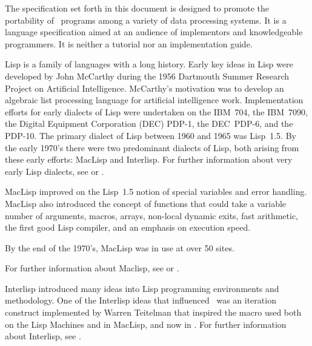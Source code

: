 

The specification set forth in this document is designed to promote
the portability of \clisp\ programs among a variety of data processing
systems. It is a language specification aimed at an audience of
implementors and knowledgeable programmers. It is neither a tutorial nor
an implementation guide.
\endsubSection%

 
Lisp is a family of languages with a long history.  Early key ideas in
Lisp were developed by John McCarthy during the 1956 Dartmouth Summer
Research Project on Artificial Intelligence.  McCarthy's motivation
was to develop an algebraic list processing language for artificial
intelligence work.
Implementation efforts for early dialects of Lisp were undertaken on
the IBM~704, the IBM~7090, the Digital Equipment Corporation (DEC) PDP-1,
the DEC~PDP-6, and the PDP-10. The primary dialect of Lisp between
1960 and 1965 was Lisp~1.5. By the early 1970's there were two
predominant dialects of Lisp, both arising from these early efforts:
MacLisp and Interlisp.
For further information about very early Lisp dialects, 
see {\AnatomyOfLisp} or {\LispOnePointFive}.
 
MacLisp improved on the Lisp~1.5 notion of special variables and error
handling. MacLisp also introduced the concept of functions that could take
a variable number of arguments, macros, arrays, non-local dynamic
exits, fast arithmetic, the first good Lisp compiler, and an emphasis
on execution speed. 





By the end of the 1970's, MacLisp was in use at over 50 sites.

For further information about Maclisp, 
see {\Moonual} or {\Pitmanual}.
 
Interlisp introduced many ideas into Lisp programming environments and
methodology. One of the Interlisp ideas that influenced \clisp\ was an iteration
construct implemented by Warren Teitelman that inspired the 
macro used both on the Lisp Machines and in MacLisp, and now in \clisp.
For further information about Interlisp,
see {\InterlispManual}.
 
